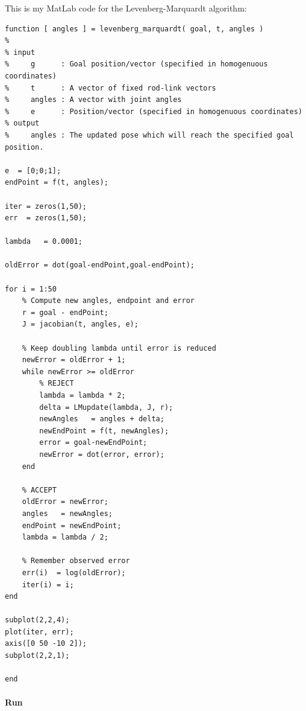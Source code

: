 \documentclass[10pt,oneside,a4paper,final,english]{memoir}
\begin{document}
This is my MatLab code for the Levenberg-Marquardt algorithm:
\begin{verbatim}
function [ angles ] = levenberg_marquardt( goal, t, angles )
%
% input
%     g      : Goal position/vector (specified in homogenuous coordinates)
%     t      : A vector of fixed rod-link vectors
%     angles : A vector with joint angles
%     e      : Position/vector (specified in homogenuous coordinates)
% output
%     angles : The updated pose which will reach the specified goal position.

e  = [0;0;1];
endPoint = f(t, angles);

iter = zeros(1,50);
err  = zeros(1,50);

lambda   = 0.0001;

oldError = dot(goal-endPoint,goal-endPoint);

for i = 1:50
    % Compute new angles, endpoint and error
    r = goal - endPoint;
    J = jacobian(t, angles, e);

    % Keep doubling lambda until error is reduced
    newError = oldError + 1;
    while newError >= oldError
        % REJECT
        lambda = lambda * 2;
        delta = LMupdate(lambda, J, r);
        newAngles   = angles + delta;
        newEndPoint = f(t, newAngles);
        error = goal-newEndPoint;
        newError = dot(error, error);
    end

    % ACCEPT
    oldError = newError;
    angles   = newAngles;
    endPoint = newEndPoint;
    lambda = lambda / 2;

    % Remember observed error
    err(i)  = log(oldError);
    iter(i) = i;
end

subplot(2,2,4);
plot(iter, err);
axis([0 50 -10 2]);
subplot(2,2,1);

end
\end{verbatim}


\paragraph{Run}
\end{document}
